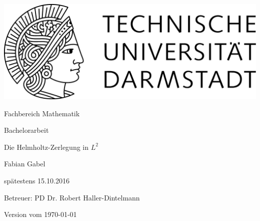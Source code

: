 \begin{titlepage}
  \begin{center}
    \vspace{1cm}
    \includegraphics[width=0.5\linewidth]{TU_Darmstadt_Logo.pdf}
    \vspace{1cm}
    
    \large{Fachbereich Mathematik}
    \vspace{2.5cm}
    
    \large{Bachelorarbeit}
    \vspace{2cm}

    \huge{Die Helmholtz-Zerlegung in $L^2$}
    
    \vspace*{3cm}    
    
		\large
                Fabian Gabel
    \vspace*{1.0cm}

    spätestens 15.10.2016 \\
    \vspace*{2cm}

    Betreuer: PD Dr. Robert Haller-Dintelmann

    \vspace*{.5cm}

    \vspace*{\fill}
    \tiny{Version vom \today}
  \end{center}
\end{titlepage}
\vspace*{\fill}
